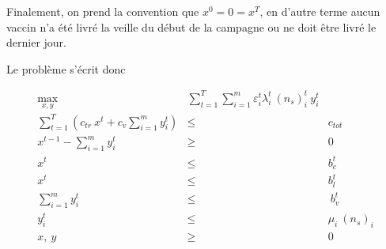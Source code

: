 \documentclass[a4paper,11pt]{report}
\begin{document}
Finalement, on prend la convention que $x^0 = 0 = x^T$, en d'autre terme aucun vaccin n'a été livré la veille du début de la campagne ou ne doit être livré le dernier jour.

Le problème s'écrit donc

\begin{eqnarray*}
\max_{x, y}& \sum_{t=1}^{T} \sum_{i=1}^{m} \varepsilon_i^t \lambda_i^t\ (n_s)_i^t\ y_i^t & \\
\sum_{t=1}^T \left(c_{tr}\ x^t + c_v \sum_{i=1}^{m} y_i^t\right) &\leq& c_{tot} \\
x^{t-1} - \sum_{i=1}^{m} y_i^t &\geq& 0 \\
x^{t} &\leq & b_c^t \\  
x^t &\leq& b_l^t \\
\sum_{i=1}^{m} y_i^t &\leq&\ b_v^t \\
y_i^t &\leq& \mu_i\ (n_s)_i \\ %
x,\ y &\geq& 0
\end{eqnarray*}


\newpage
\lstset{style=mystyle}
\end{document}
